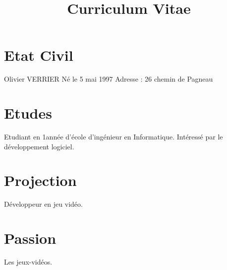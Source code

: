 \documentclass{article}
\title{Curriculum Vitae}
\begin{document}
\maketitle

\section{Etat Civil}
Olivier VERRIER\newline
Né le 5 mai 1997\newline
Adresse : 26 chemin de Pagneau\newline

\section{Etudes}
Etudiant en 1\ier année d'école d'ingénieur en Informatique.
Intéressé par le développement logiciel.

\section{Projection}
Développeur en jeu vidéo.

\section{Passion}
Les jeux-vidéos.
\end{document}
